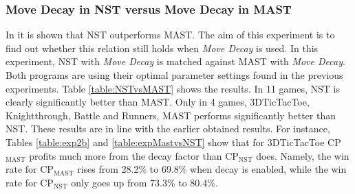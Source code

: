 \documentclass[journal]{IEEEtran}
\begin{document}
\subsubsection{Move Decay in NST versus Move Decay in MAST}
In \cite{ngramArticle} it is shown that NST outperforms MAST. The aim of this experiment is to find out whether this relation still holds when \textit{Move Decay} is used. In this experiment, NST with \textit{Move Decay} is matched against MAST with \textit{Move Decay}. Both programs are using their optimal parameter settings found in the previous experiments. Table \ref{table:NSTvsMAST} shows the results. In 11 games, NST is clearly significantly better than MAST. Only in 4 games, 3DTicTacToe, Knightthrough, Battle and Runners, MAST performs significantly better than NST. These results are in line with the earlier obtained results. For instance, Tables \ref{table:exp2b} and \ref{table:expMastvsNST} show that for 3DTicTacToe CP$_{\textrm{MAST}}$ profits much more from the decay factor than CP$_{\textrm{NST}}$ does. Namely, the win rate for CP$_{\textrm{MAST}}$ rises from 28.2\% to 69.8\% when decay is enabled, while the win rate for CP$_{\textrm{NST}}$ only goes up from 73.3\% to 80.4\%.
\end{document}
